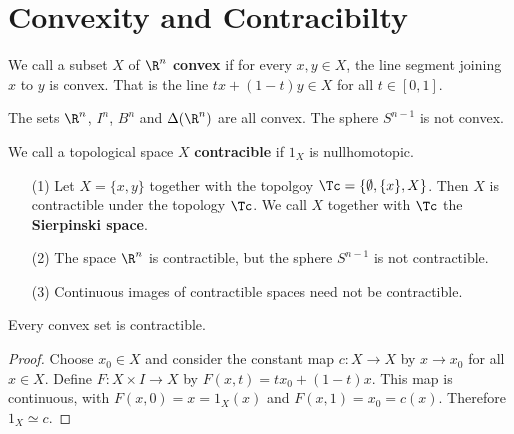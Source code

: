 
\section{Convexity and Contracibilty}

\begin{definition}
    We call a subset $X$ of $\R^n$  \textbf{convex} if for every $x,y \in X$,
    the line segment joining  $x$ to  $y$ is convex. That is the line
    $tx+(1-t)y \in X$ for all $t \in [0,1]$.
\end{definition}

\begin{example}\label{2.4}
    The sets $\R^n$, $I^n$,  $B^n$ and  $\Delta(\R^n)$ are all convex. The
    sphere $S^{n-1}$ is not convex.
\end{example}

\begin{definition}
    We call a topological space $X$  \textbf{contracible} if $1_X$ is
    nullhomotopic.
\end{definition}

\begin{example}\label{2.5}
    \begin{enumerate}
        \item[(1)] Let $X=\{x,y\}$ together with the topolgoy $\Tc=\{\emptyset, \{x\}, X\}$.
            Then $X$ is contractible under the topology $\Tc$. We call  $X$
            together with  $\Tc$ the \textbf{Sierpinski space}.

        \item[(2)] The space $\R^n$ is contractible, but the sphere  $S^{n-1}$
            is not contractible.

        \item[(3)] Continuous images of contractible spaces need not be
            contractible.
    \end{enumerate}
\end{example}

\begin{theorem}\label{2.3.1}
    Every convex set is contractible.
\end{theorem}
\begin{proof}
    Choose $x_0 \in X$ and consider the constant map $c:X \xrightarrow{} X$ by
    $x \xrightarrow{} x_0$ for all $x \in X$. Define  $F:X \times I
    \xrightarrow{} X$ by $F(x,t)=tx_0+(1-t)x$. This map is continuous, with
    $F(x,0)=x=1_X(x)$ and $F(x,1)=x_0=c(x)$. Therefore $1_X \simeq c$.
\end{proof}

